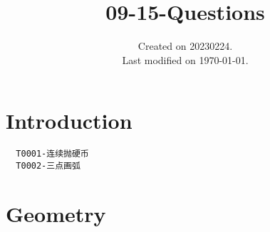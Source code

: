 \documentclass[UTF8]{../09-Mathematics}
\begin{document}
\title{09-15-Questions}
\date{Created on 20230224.\\   Last modified on \today.}
\maketitle
\tableofcontents


\chapter{Introduction}


\begin{lstlisting}
  T0001-连续抛硬币
  T0002-三点画弧

\end{lstlisting}


\chapter{Geometry}
\end{document}
